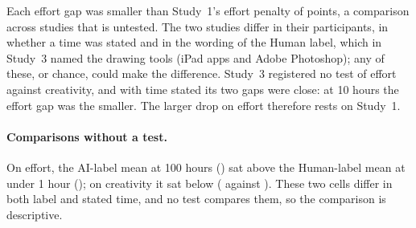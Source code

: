 Each effort gap was smaller than Study~1's effort penalty of \SOneHOneEffDiff{} points, a comparison across studies that is untested. The two studies differ in their participants, in whether a time was stated and in the wording of the Human label, which in Study~3 named the drawing tools (iPad apps and Adobe Photoshop); any of these, or chance, could make the difference. Study~3 registered no test of effort against creativity, and with time stated its two gaps were close: at 10 hours the effort gap was the smaller. The larger drop on effort therefore rests on Study~1.

\paragraph*{Comparisons without a test.}
On effort, the AI-label mean at 100 hours (\SThreeEffMeanAIHundredHours) sat above the Human-label mean at under 1 hour (\SThreeEffMeanHumanUnderOneHour); on creativity it sat below (\SThreeCreatMeanAIHundredHours{} against \SThreeCreatMeanHumanUnderOneHour). These two cells differ in both label and stated time, and no test compares them, so the comparison is descriptive.
